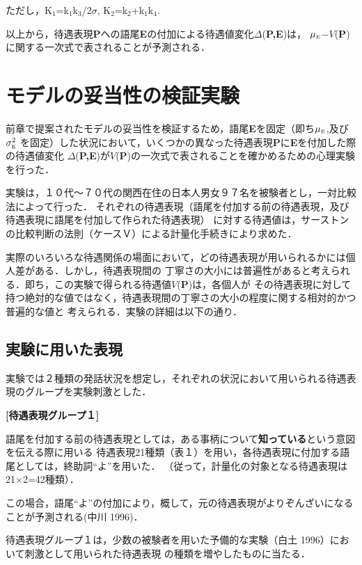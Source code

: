 ただし，K\(_{1}\)=k\(_{1}\)k\(_{3}\)/2\(\sigma\), K\(_{2}\)=k\(_{2}\)+k\(_{1}\)k\(_{4}\).

以上から，待遇表現{\bf P}への語尾{\bf E}の付加による待遇値変化\(\Delta\)({\bf P,E})は，
\(\mu_{\mbox{\tiny{E}}}\)−\(V\)({\bf P})に関する一次式で表されることが予測される．

\section{モデルの妥当性の検証実験}
前章で提案されたモデルの妥当性を検証するため，語尾{\bf E}を固定（即ち\(\mu_{\mbox{\tiny{E}}}\),及び\(\sigma_{\mbox{\tiny{E}}}^{2}\)
を固定）した状況において，いくつかの異なった待遇表現{\bf P}に{\bf E}を付加した際の待遇値変化
\(\Delta\)({\bf P,E})が\(V\)({\bf P})の一次式で表されることを確かめるための心理実験を行った．

実験は，１０代〜７０代の関西在住の日本人男女９７名を被験者とし，一対比較法によって行った．
それぞれの待遇表現（語尾を付加する前の待遇表現，及び待遇表現に語尾を付加して作られた待遇表現）
に対する待遇値は，サーストンの比較判断の法則（ケースＶ）による計量化手続きにより求めた．

実際のいろいろな待遇関係の場面において，どの待遇表現が用いられるかには個人差がある．しかし，待遇表現間の
丁寧さの大小には普遍性があると考えられる．即ち，この実験で得られる待遇値\(V\)({\bf P})は，各個人が
その待遇表現に対して持つ絶対的な値ではなく，待遇表現間の丁寧さの大小の程度に関する相対的かつ普遍的な値と
考えられる．実験の詳細は以下の通り．

\subsection{実験に用いた表現}
実験では２種類の発話状況を想定し，それぞれの状況において用いられる待遇表現のグループを実験刺激とした．

\bigskip

{\flushleft \bf [待遇表現グループ１]}

\bigskip

語尾を付加する前の待遇表現としては，ある事柄について{\bf 知っている}という意図を伝える際に用いる
待遇表現21種類（表１）を用い，各待遇表現に付加する語尾としては，終助詞``よ''を用いた．
（従って，計量化の対象となる待遇表現は21×2=42種類）．

この場合，語尾``よ''の付加により，概して，元の待遇表現がよりぞんざいになることが予測される(中川 1996)．

待遇表現グループ１は，少数の被験者を用いた予備的な実験（白土 1996）において刺激として用いられた待遇表現
の種類を増やしたものに当たる．

